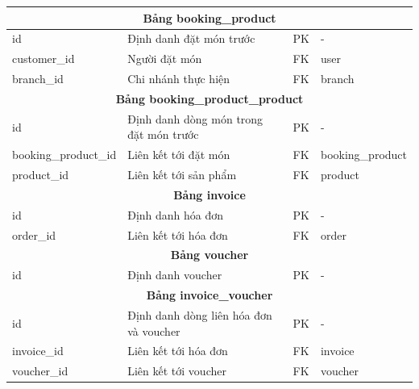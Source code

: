 \begin{longtable}{|l|p{6cm}|l|l|}
	\multicolumn{4}{|c|}{\textbf{Bảng booking\_product}}                                                                    \\
	\hline
	id                      & Định danh đặt món trước                        & PK                 & -                       \\
	customer\_id            & Người đặt món                                  & FK                 & user                    \\
	branch\_id              & Chi nhánh thực hiện                            & FK                 & branch                  \\
	\hline

	\multicolumn{4}{|c|}{\textbf{Bảng booking\_product\_product}}                                                           \\
	\hline
	id                      & Định danh dòng món trong đặt món trước         & PK                 & -                       \\
	booking\_product\_id    & Liên kết tới đặt món                           & FK                 & booking\_product        \\
	product\_id             & Liên kết tới sản phẩm                          & FK                 & product                 \\
	\hline

	\multicolumn{4}{|c|}{\textbf{Bảng invoice}}                                                                             \\
	\hline
	id                      & Định danh hóa đơn                              & PK                 & -                       \\
	order\_id               & Liên kết tới hóa đơn                           & FK                 & order                   \\
	\hline

	\multicolumn{4}{|c|}{\textbf{Bảng voucher}}                                                                             \\
	\hline
	id                      & Định danh voucher                              & PK                 & -                       \\
	\hline

	\multicolumn{4}{|c|}{\textbf{Bảng invoice\_voucher}}                                                                    \\
	\hline
	id                      & Định danh dòng liên hóa đơn và voucher         & PK                 & -                       \\
	invoice\_id             & Liên kết tới hóa đơn                           & FK                 & invoice                 \\
	voucher\_id             & Liên kết tới voucher                           & FK                 & voucher                 \\
	\hline
\end{longtable}

